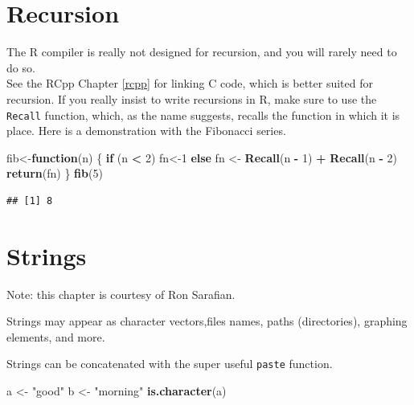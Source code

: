 \documentclass[]{book}
\newenvironment{Shaded}{\begin{snugshade}}{\end{snugshade}}
\newcommand{\KeywordTok}[1]{\textcolor[rgb]{0.13,0.29,0.53}{\textbf{#1}}}
\newcommand{\DecValTok}[1]{\textcolor[rgb]{0.00,0.00,0.81}{#1}}
\newcommand{\StringTok}[1]{\textcolor[rgb]{0.31,0.60,0.02}{#1}}
\newcommand{\ControlFlowTok}[1]{\textcolor[rgb]{0.13,0.29,0.53}{\textbf{#1}}}
\newcommand{\OperatorTok}[1]{\textcolor[rgb]{0.81,0.36,0.00}{\textbf{#1}}}
\newcommand{\NormalTok}[1]{#1}
\theoremstyle{definition}
\theoremstyle{definition}
\theoremstyle{definition}
\theoremstyle{remark}
\begin{document}
\section{Recursion}\label{recursion}

The R compiler is really not designed for recursion, and you will rarely
need to do so.\\
See the RCpp Chapter \ref{rcpp} for linking C code, which is better
suited for recursion. If you really insist to write recursions in R,
make sure to use the \texttt{Recall} function, which, as the name
suggests, recalls the function in which it is place. Here is a
demonstration with the Fibonacci series.

\begin{Shaded}
\begin{Highlighting}[]
\NormalTok{fib<-}\ControlFlowTok{function}\NormalTok{(n) \{}
    \ControlFlowTok{if}\NormalTok{ (n }\OperatorTok{<}\StringTok{ }\DecValTok{2}\NormalTok{) fn<-}\DecValTok{1} 
    \ControlFlowTok{else}\NormalTok{ fn <-}\StringTok{ }\KeywordTok{Recall}\NormalTok{(n }\OperatorTok{-}\StringTok{ }\DecValTok{1}\NormalTok{) }\OperatorTok{+}\StringTok{ }\KeywordTok{Recall}\NormalTok{(n }\OperatorTok{-}\StringTok{ }\DecValTok{2}\NormalTok{) }
    \KeywordTok{return}\NormalTok{(fn)}
\NormalTok{\} }
\KeywordTok{fib}\NormalTok{(}\DecValTok{5}\NormalTok{)}
\end{Highlighting}
\end{Shaded}

\begin{verbatim}
## [1] 8
\end{verbatim}

\section{Strings}\label{strings}

Note: this chapter is courtesy of Ron Sarafian.

Strings may appear as character vectors,files names, paths
(directories), graphing elements, and more.

Strings can be concatenated with the super useful \texttt{paste}
function.

\begin{Shaded}
\begin{Highlighting}[]
\NormalTok{a <-}\StringTok{ "good"}
\NormalTok{b <-}\StringTok{ "morning"}
\KeywordTok{is.character}\NormalTok{(a)}
\end{Highlighting}
\end{Shaded}
\end{document}
